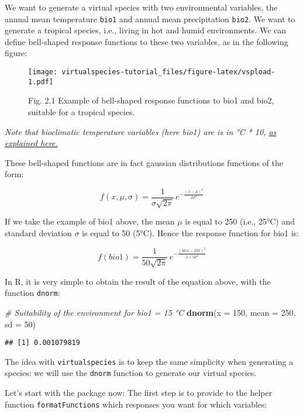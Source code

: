 \documentclass[]{article}
\newenvironment{Shaded}{\begin{snugshade}}{\end{snugshade}}
\newcommand{\KeywordTok}[1]{\textcolor[rgb]{0.13,0.29,0.53}{\textbf{#1}}}
\newcommand{\DataTypeTok}[1]{\textcolor[rgb]{0.13,0.29,0.53}{#1}}
\newcommand{\DecValTok}[1]{\textcolor[rgb]{0.00,0.00,0.81}{#1}}
\newcommand{\CommentTok}[1]{\textcolor[rgb]{0.56,0.35,0.01}{\textit{#1}}}
\newcommand{\NormalTok}[1]{#1}
\begin{document}
We want to generate a virtual species with two environmental variables,
the annual mean temperature \texttt{bio1} and annual mean precipitation
\texttt{bio2}. We want to generate a tropical species, i.e., living in
hot and humid environments. We can define bell-shaped response functions
to these two variables, as in the following figure:

\begin{figure}
\centering
\texttt{[image: virtualspecies-tutorial\_files/figure-latex/vspload-1.pdf]}
\caption{Fig. 2.1 Example of bell-shaped response functions to bio1 and
bio2, suitable for a tropical species.}
\end{figure}

\emph{Note that bioclimatic temperature variables (here bio1) are is in
°C * 10, \href{http://worldclim.org/bioclim}{as explained here.}}

These bell-shaped functions are in fact gaussian distributions functions
of the form:

\[ f(x, \mu, \sigma) = \frac{1}{\sigma\sqrt{2\pi}}\, e^{-\frac{(x - \mu)^2}{2 \sigma^2}}\]

If we take the example of bio1 above, the mean \(\mu\) is equal to 250
(i.e., 25°C) and standard deviation \(\sigma\) is equal to 50 (5°C).
Hence the response function for bio1 is:

\[ f(bio1) = \frac{1}{50\sqrt{2\pi}}\, e^{-\frac{(bio1 - 250)^2}{2 \times 50^2}} \]

In R, it is very simple to obtain the result of the equation above, with
the function \texttt{dnorm}:

\begin{Shaded}
\begin{Highlighting}[]
\CommentTok{# Suitability of the environment for bio1 = 15 °C}
\KeywordTok{dnorm}\NormalTok{(}\DataTypeTok{x =} \DecValTok{150}\NormalTok{, }\DataTypeTok{mean =} \DecValTok{250}\NormalTok{, }\DataTypeTok{sd =} \DecValTok{50}\NormalTok{)}
\end{Highlighting}
\end{Shaded}

\begin{verbatim}
## [1] 0.001079819
\end{verbatim}

The idea with \texttt{virtualspecies} is to keep the same simplicity
when generating a species: we will use the \texttt{dnorm} function to
generate our virtual species.

Let's start with the package now: The first step is to provide to the
helper function \texttt{formatFunctions} which responses you want for
which variables:
\end{document}
